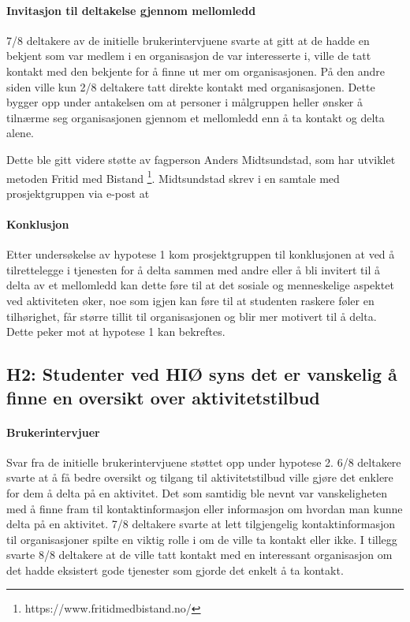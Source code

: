 \paragraph{Invitasjon til deltakelse gjennom mellomledd}
7/8 deltakere av de initielle brukerintervjuene svarte at gitt at de hadde en bekjent som var medlem i en organisasjon de var interesserte i, ville de tatt kontakt med den bekjente for å finne ut mer om organisasjonen. På den andre siden ville kun 2/8 deltakere tatt direkte kontakt med organisasjonen. Dette bygger opp under antakelsen om at personer i målgruppen heller ønsker å tilnærme seg organisasjonen gjennom et mellomledd enn å ta kontakt og delta alene. 

Dette ble gitt videre støtte av fagperson Anders Midtsundstad, som har utviklet metoden Fritid med Bistand \footnote{https://www.fritidmedbistand.no/}. Midtsundstad skrev i en samtale med prosjektgruppen via e-post at  \cite{MIDTSUNDSTAD-EPOST:14}

\paragraph{Konklusjon}
Etter undersøkelse av hypotese 1 kom prosjektgruppen til konklusjonen at ved å tilrettelegge i tjenesten for å delta sammen med andre eller å bli invitert til å delta av et mellomledd kan dette føre til at det sosiale og menneskelige aspektet ved aktiviteten øker, noe som igjen kan føre til at studenten raskere føler en tilhørighet, får større tillit til organisasjonen og blir mer motivert til å delta. Dette peker mot at hypotese 1 kan bekreftes.

\subsection{H2: Studenter ved HIØ syns det er vanskelig å finne en oversikt over aktivitetstilbud}
\paragraph{Brukerintervjuer}
Svar fra de initielle brukerintervjuene støttet opp under hypotese 2. 6/8 deltakere svarte at å få bedre oversikt og tilgang til aktivitetstilbud ville gjøre det enklere for dem å delta på en aktivitet. Det som samtidig ble nevnt var vanskeligheten med å finne fram til kontaktinformasjon eller informasjon om hvordan man kunne delta på en aktivitet. 7/8 deltakere svarte at lett tilgjengelig kontaktinformasjon til organisasjoner spilte en viktig rolle i om de ville ta kontakt eller ikke. I tillegg svarte 8/8 deltakere at de ville tatt kontakt med en interessant organisasjon om det hadde eksistert gode tjenester som gjorde det enkelt å ta kontakt.

